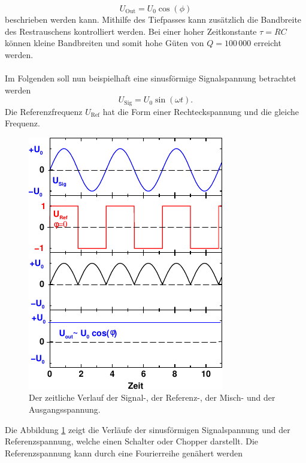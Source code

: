     \begin{equation*}
        U_\text{Out} = U_0 \cos{(\phi)}
    \end{equation*}
    beschrieben werden kann. 
    Mithilfe des Tiefpasses kann zusätzlich die Bandbreite des Restrauschens kontrolliert werden. 
    Bei einer hoher Zeitkonstante $\tau = RC$ können kleine Bandbreiten und somit hohe Güten von $𝑄 = 100\,000$ erreicht werden.\\
    \\
    Im Folgenden soll nun beispielhaft eine sinusförmige Signalspannung betrachtet werden
    \begin{equation*}
        U_\text{Sig} = U_0 \sin{(\omega t)} .
    \end{equation*}
    Die Referenzfrequenz $U_\text{Ref}$ hat die Form einer Rechteckspannung und die gleiche Frequenz.
    \begin{figure}[H]
        \centering
        \includegraphics[scale=0.9]{content/img/Abb_2.pdf}
        \caption{Der zeitliche Verlauf der Signal-, der Referenz-, der Misch- und der Ausgangsspannung.}
        \label{fig:signalverläufe}
    \end{figure}
    Die Abbildung \ref{fig:signalverläufe} zeigt die Verläufe der sinusförmigen Signalspannung und der Referenzspannung,
    welche einen Schalter oder Chopper darstellt.
    Die Referenzspannung kann durch eine Fourierreihe genähert werden 
